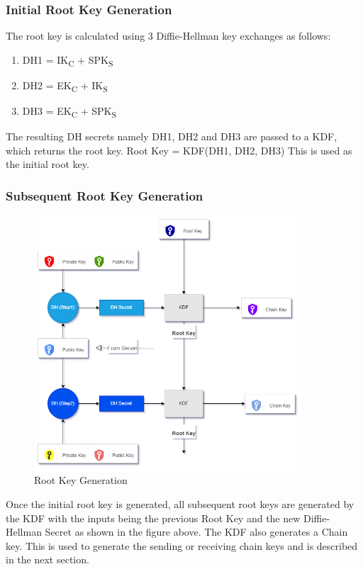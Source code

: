 \subsubsection{Initial Root Key Generation}
The root key is calculated using 3 Diffie-Hellman key exchanges as follows:
\begin{enumerate}
    \item DH1 = IK\textsubscript{C}   +  SPK\textsubscript{S}
    \item DH2 = EK\textsubscript{C}   +  IK\textsubscript{S}
    \item DH3 = EK\textsubscript{C}   +  SPK\textsubscript{S}
\end{enumerate}

The resulting DH secrets namely DH1, DH2 and DH3 are passed to a KDF, which returns the root key.
Root Key = KDF(DH1, DH2, DH3)
This is used as the initial root key.

\subsubsection{Subsequent Root Key Generation}
\begin{figure}[ht!]
\centering
\includegraphics[width= 100mm]{./images/security_overview1-Root Key Generation.png}
\caption{Root Key Generation}
\end{figure}

Once the initial root key is generated, all subsequent root keys are generated by the KDF with the inputs being the previous Root Key and the new Diffie-Hellman Secret as shown in the figure above. The KDF also generates a Chain key. This is used to generate the sending or receiving chain keys and is described in the next section.


